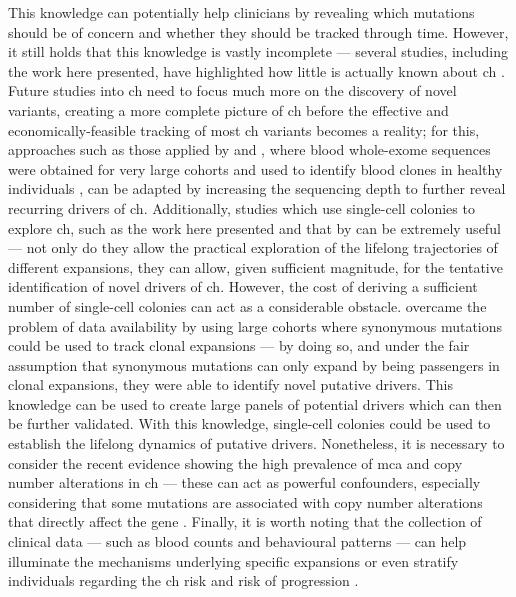 This knowledge can potentially help clinicians by revealing which mutations should be of concern and whether they should be tracked through time. However, it still holds that this knowledge is vastly incomplete --- several studies, including the work here presented, have highlighted how little is actually known about \ac{ch} \cite{Poon2020-ek,Mitchell2021-zl,Fabre2021-uw}. Future studies into \ac{ch} need to focus much more on the discovery of novel variants, creating a more complete picture of \ac{ch} before the effective and economically-feasible tracking of most \ac{ch} variants becomes a reality; for this, approaches such as those applied by  and , where blood whole-exome sequences were obtained for very large cohorts and used to identify blood clones in healthy individuals \cite{Jaiswal2014-rl,Genovese2014-eu}, can be adapted by increasing the sequencing depth to further reveal recurring drivers of \ac{ch}. Additionally, studies which use single-cell colonies to explore \ac{ch}, such as the work here presented and that by  can be extremely useful --- not only do they allow the practical exploration of the lifelong trajectories of different expansions, they can allow, given sufficient magnitude, for the tentative identification of novel drivers of \ac{ch}. However, the cost of deriving a sufficient number of single-cell colonies can act as a considerable obstacle.  overcame the problem of data availability by using large cohorts where synonymous mutations could be used to track clonal expansions --- by doing so, and under the fair assumption that synonymous mutations can only expand by being passengers in clonal expansions, they were able to identify novel putative drivers. This knowledge can be used to create large panels of potential drivers which can then be further validated. With this knowledge, single-cell colonies could be used to establish the lifelong dynamics of putative drivers. Nonetheless, it is necessary to consider the recent evidence showing the high prevalence of \ac{mca} and copy number alterations in \ac{ch} --- these can act as powerful confounders, especially considering that some mutations are associated with copy number alterations that directly affect the gene \cite{Gao2021-ph,Saiki2021-sq}. Finally, it is worth noting that the collection of clinical data --- such as blood counts and behavioural patterns --- can help illuminate the mechanisms underlying specific expansions or even stratify individuals regarding the \ac{ch} risk and risk of progression \cite{Dawoud2020-af,Abelson2018-wh}.
